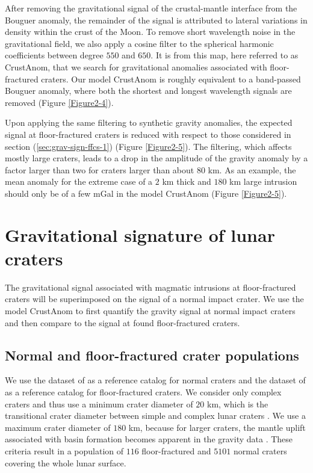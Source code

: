 After  removing   the  gravitational  signal  of   the  crustal-mantle
interface from  the Bouguer  anomaly, the remainder  of the  signal is
attributed to  lateral variations in  density within the crust  of the
Moon. To remove short wavelength  noise in the gravitational field, we
also  apply a  cosine filter  to the  spherical harmonic  coefficients
between degree $550$ and $650$. It  is from this map, here referred to
as CrustAnom,  that we  search for gravitational  anomalies associated
with  floor-fractured   craters.   Our  model  CrustAnom   is  roughly
equivalent to a  band-passed Bouguer anomaly, where  both the shortest
and longest wavelength signals are removed (Figure \ref{Figure2-4}).

Upon applying the  same filtering to synthetic  gravity anomalies, the
expected signal at floor-fractured craters  is reduced with respect to
those  considered  in   section  (\ref{sec:grav-sign-ffcs-1})  (Figure
\ref{Figure2-5}).  The filtering, which  affects mostly large craters,
leads to a  drop in the amplitude  of the gravity anomaly  by a factor
larger than two for craters larger than about $80$ km.  As an example,
the mean anomaly for  the extreme case of a $2$ km  thick and $180$ km
large intrusion  should only be of  a few mGal in  the model CrustAnom
(Figure \ref{Figure2-5}).


\section{Gravitational signature of lunar craters}
\label{sec:grav-sign-lunar}

The  gravitational  signal  associated  with  magmatic  intrusions  at
floor-fractured craters will be superimposed on the signal of a normal
impact  crater.  We  use the  model  CrustAnom to  first quantify  the
gravity signal at normal impact craters and then compare to the signal
at found floor-fractured craters.
 
\subsection{Normal and floor-fractured crater populations}
\label{sec:unmod-floor-fract}
 
We use the  dataset of \citet{Head:2010fy} as a  reference catalog for
normal  craters  and  the   dataset  of  \citet{Jozwiak:2012dq}  as  a
reference  catalog  for  floor-fractured craters.   We  consider  only
complex craters  and thus use  a minimum  crater diameter of  $20$ km,
which is the  transitional crater diameter between  simple and complex
lunar  craters  \citep{Pike:1974ux,Pike:1980eh}.   We  use  a  maximum
crater diameter  of $180$ km,  because for larger craters,  the mantle
uplift associated with basin formation becomes apparent in the gravity
data \citep{Melosh:2013cz}.  These criteria  result in a population of
$116$  floor-fractured and  $5101$ normal  craters covering  the whole
lunar surface.
	
